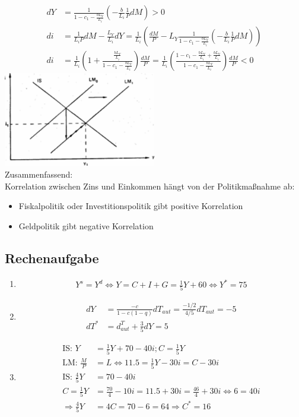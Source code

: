 \documentclass{scrartcl}
\begin{document}
\begin{enumerate}
\begin{align*}
    dY &= \frac{1}{1-c_1 -\frac{b L_Y}{L_i}} \left(- \frac{b}{L_i} \frac{1}{P}dM\right) >0\\
    di &= \frac{1}{L_i P} dM-\frac{L_Y}{L_i} dY = \frac{1}{L_i}\left(\frac{dM}{P}-L_Y \frac{1}{1-c_1 -\frac{b L_Y}{L_i}} \left(- \frac{b}{L_i} \frac{1}{P}dM\right) \right)\\
    di &= \frac{1}{L_i}\left(1 + \frac{\frac{b L_Y}{L_i}}{1-c_1-\frac{b L_Y}{L_i}}\right) \frac{dM}{P} =\frac{1}{L_i}\left(\frac{ 1-c_1-\frac{b L_Y}{L_i} + \frac{b L_Y}{L_i}}{1-c_1-\frac{b L_Y}{L_i}}\right) \frac{dM}{P}<0
\end{align*}
\includegraphics[width=0.5\textwidth]{Bilder/ISLMGeldpolitik.pdf}\\
Zusammenfassend:\\
Korrelation zwischen Zins und Einkommen h\"{a}ngt von der Politikma{\ss}nahme ab:
\begin{itemize}
  \item Fiskalpolitik oder Investitionspolitik gibt positive Korrelation
  \item Geldpolitik gibt negative Korrelation
\end{itemize}
\end{enumerate}

\subsection{Rechenaufgabe}
\begin{enumerate}
  \item \begin{align*}
    Y^s=Y^d \Leftrightarrow Y = C + I + G = \frac{1}{5}Y + 60 \Leftrightarrow Y^* = 75
  \end{align*}
  \item \begin{align*}
    dY &= \frac{-c}{1-c(1-q)} dT_{aut} = \frac{-1/2}{4/5} dT_{aut} = -5\\
    dT^* &= d^T_{aut} + \frac{3}{5}dY = 5
  \end{align*}
  \item \begin{align*}
    \text{IS: } Y &= \frac{1}{5}Y + 70 -40 i; C=\frac{1}{5}Y\\
    \text{LM: } \frac{M}{P} &= L \Leftrightarrow11.5 = \frac{1}{5}Y -30i = C-30i\\
    \text{IS: } \frac{4}{5} Y &= 70-40i\\
    C=\frac{1}{5}Y &= \frac{70}{4}-10i = 11.5 + 30i = \frac{46}{4}+30i \Leftrightarrow 6 = 40i\\
    \Rightarrow \frac{4}{5} Y &= 4 C = 70-6 = 64 \Rightarrow C^*=16
  \end{align*}
\end{enumerate}
\end{document}
